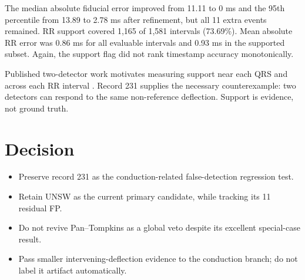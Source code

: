 \documentclass[10pt]{article}
\begin{document}
The median absolute fiducial error improved from 11.11 to 0 ms and the 95th percentile from 13.89 to 2.78 ms after refinement, but all 11 extra events remained. RR support covered 1,165 of 1,581 intervals (73.69\%). Mean absolute RR error was 0.86 ms for all evaluable intervals and 0.93 ms in the supported subset. Again, the support flag did not rank timestamp accuracy monotonically.

Published two-detector work motivates measuring support near each QRS and across each RR interval \cite{ho2024rrquality,ho2025rraccuracy}. Record 231 supplies the necessary counterexample: two detectors can respond to the same non-reference deflection. Support is evidence, not ground truth.


\section{Decision}
\begin{itemize}
\item Preserve record 231 as the conduction-related false-detection regression test.
\item Retain UNSW as the current primary candidate, while tracking its 11 residual FP.
\item Do not revive Pan--Tompkins as a global veto despite its excellent special-case result.
\item Pass smaller intervening-deflection evidence to the conduction branch; do not label it artifact automatically.
\end{itemize}

\begingroup{}


\endgroup
\end{document}
